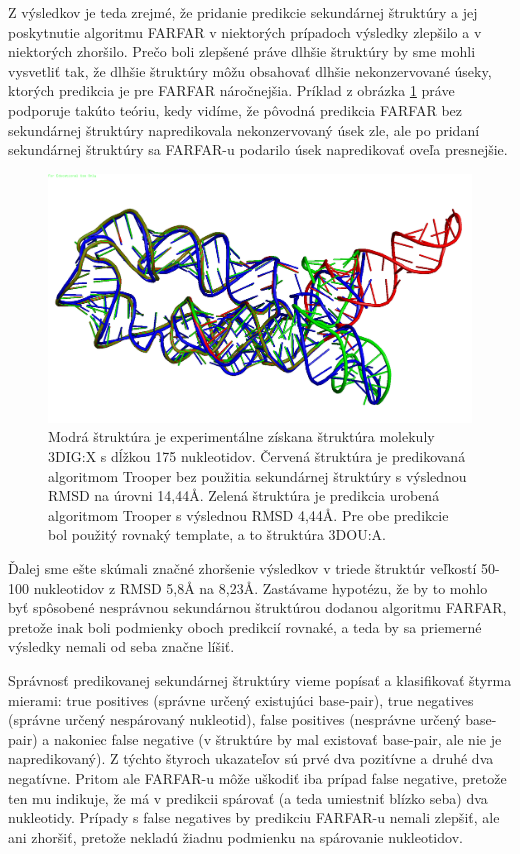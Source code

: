 \indent Z výsledkov je teda zrejmé, že pridanie predikcie sekundárnej štruktúry a jej poskytnutie algoritmu FARFAR v niektorých prípadoch výsledky zlepšilo a v niektorých zhoršilo. Prečo boli zlepšené práve dlhšie štruktúry by sme mohli vysvetliť tak, že dlhšie štruktúry môžu obsahovať dlhšie nekonzervované úseky, ktorých predikcia je pre FARFAR náročnejšia. Príklad z obrázka \ref{obr5.1} práve podporuje takúto teóriu, kedy vidíme, že pôvodná predikcia FARFAR bez sekundárnej štruktúry napredikovala nekonzervovaný úsek zle, ale po pridaní sekundárnej štruktúry sa FARFAR-u podarilo úsek napredikovať oveľa presnejšie.
\begin{figure}%
\includegraphics[width=\textwidth]{../img/struct1}
\caption{Modrá štruktúra je experimentálne získana štruktúra molekuly 3DIG:X s dĺžkou 175 nukleotidov. Červená štruktúra je predikovaná algoritmom Trooper bez použitia sekundárnej štruktúry s výslednou RMSD na úrovni 14,44Å. Zelená štruktúra je predikcia urobená algoritmom Trooper s výslednou RMSD 4,44Å. Pre obe predikcie bol použitý rovnaký template, a to štruktúra 3DOU:A.}
\label{obr5.1}
\end{figure}


\indent Ďalej sme ešte skúmali značné zhoršenie výsledkov v triede štruktúr veľkostí 50-100 nukleotidov z RMSD 5,8Å na 8,23Å. Zastávame hypotézu, že by to mohlo byť spôsobené nesprávnou sekundárnou štruktúrou dodanou algoritmu FARFAR, pretože inak boli podmienky oboch predikcií rovnaké, a teda by sa priemerné výsledky nemali od seba značne líšiť.


\indent Správnosť predikovanej sekundárnej štruktúry vieme popísať a klasifikovať štyrma mierami: true positives (správne určený existujúci base-pair), true negatives (správne určený nespárovaný nukleotid), false positives (nesprávne určený base-pair) a nakoniec false negative (v štruktúre by mal existovať base-pair, ale nie je napredikovaný). Z týchto štyroch ukazateľov sú prvé dva pozitívne a druhé dva negatívne. Pritom ale FARFAR-u môže uškodiť iba prípad false negative, pretože ten mu indikuje, že má v predikcii spárovať (a teda umiestniť blízko seba) dva nukleotidy. Prípady s false negatives by predikciu FARFAR-u nemali zlepšiť, ale ani zhoršiť, pretože nekladú žiadnu podmienku na spárovanie nukleotidov. 


